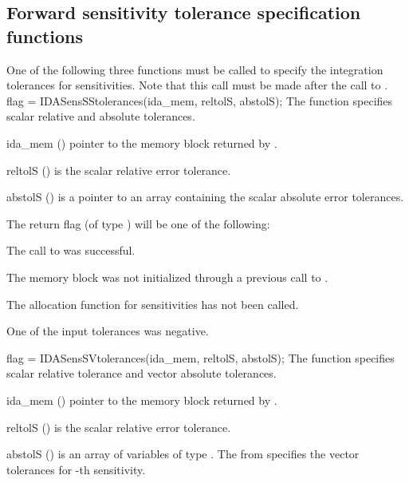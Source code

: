 \subsection{Forward sensitivity tolerance specification functions}
\label{sss:idafwdtolerances}
One of the following three functions must be called to specify the
integration tolerances for sensitivities. Note that this call must be made after 
the call to .
{
  flag = IDASensSStolerances(ida\_mem, reltolS, abstolS);
}
{
  The function  specifies scalar relative and absolute
  tolerances.
}
{
  \begin{args}
  \item[ida\_mem] ()
    pointer to the {\idas} memory block returned by .
  \item[reltolS] ()
    is the scalar relative error tolerance.
  \item[abstolS] ()
    is a pointer to an array containing the scalar absolute 
    error tolerances.
  \end{args}
}
{
  The return flag  (of type ) will be one of the following:
  \begin{args}
  \item[\Id{IDA\_SUCCESS}]
    The call to  was successful.
  \item[\Id{IDA\_MEM\_NULL}] 
    The {\idas} memory block was not initialized through a previous call to
    .
  \item[\Id{IDA\_NO\_SENS}] 
    The allocation function for sensitivities  has not been called.
  \item[\Id{IDA\_ILL\_INPUT}] 
    One of the input tolerances was negative.
  \end{args}
}
{}
{
  flag = IDASensSVtolerances(ida\_mem, reltolS, abstolS);
}
{
  The function  specifies scalar relative tolerance and
  vector absolute tolerances.
}
{
  \begin{args}
  \item[ida\_mem] ()
    pointer to the {\idas} memory block returned by .
  \item[reltolS] ()
    is the scalar relative error tolerance.
  \item[abstolS] ()
    is an array of  variables of type . The  from
     specifies the vector tolerances for -th sensitivity.
  \end{args}
}
